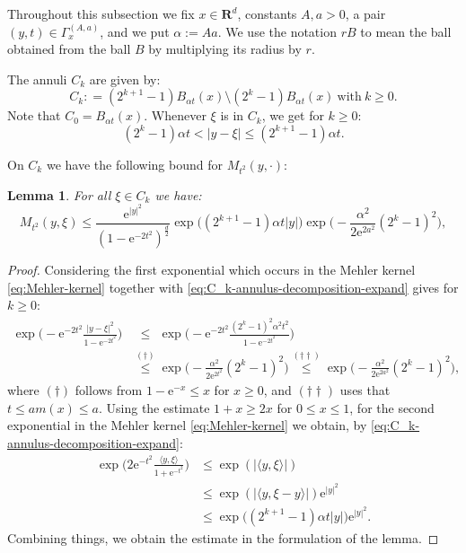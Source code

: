 \documentclass{amsart}
\newtheorem{lemma}{Lemma}
\theoremstyle{remark}
\newcommand{\la}{\langle}
\newcommand{\ra}{\rangle}
\renewcommand{\leq}{\leqslant}
\renewcommand{\leq}{\leqslant}
\renewcommand{\geq}{\geqslant}
\newcommand{\R}{\mathbf R}
\newcommand{\e}{\mathrm{e}} %
\renewcommand{\leq}{\leqslant}%
\renewcommand{\geq}{\geqslant}%
\begin{document}
Throughout this subsection we fix $x\in \R^d$, constants $A,a>0$, a pair
$(y,t)\in \Gamma_x^{(A,a)}$, and we put $\alpha:=Aa$. 
We use the notation $rB$ to mean the ball obtained from the ball $B$ by
multiplying its radius by $r$.

The annuli $C_k$ are given by:
\begin{equation}
  \label{eq:C_k-annulus-decomposition}
  C_k : = (2^{k + 1} - 1)B_{\alpha t}(x) \setminus (2^k - 1)B_{\alpha t}(x)
  \:\text{with}\: k \geq 0.
\end{equation}
Note that $C_0 = B_{\alpha t}(x)$. Whenever $\xi$ is in $C_k$, we get for $k
\geq 0$:
\begin{equation}
  \label{eq:C_k-annulus-decomposition-expand}
  (2^k - 1)\alpha t < |y - \xi| \leq (2^{k + 1} - 1) \alpha t.
\end{equation}

On $C_k$ we have the following bound for $M_{t^2}(y,\cdot)$:
\begin{lemma}\label{lem:On-diagonal-kernel-estimates-on-Ck}
  For all $\xi \in C_k$ we have:
  \begin{equation}
    M_{t^2}(y, \xi) \leq \frac{\e^{|y|^2}}{(1 - \e^{-2t^2})^{\frac{d}2}}
    \exp\bigl((2^{k + 1} - 1) \alpha t |y| \bigr) \exp\Big(\!-\!\frac{\alpha^2}{2 \e^{2 a^2}} (2^k - 1)^2 \Big),
  \end{equation}
\end{lemma}
\begin{proof}
  Considering the first exponential which occurs in the Mehler kernel
  \eqref{eq:Mehler-kernel} together with
  \eqref{eq:C_k-annulus-decomposition-expand} gives for $k \geq 0$:
  \begin{align*}
    \exp\biggl(-\e^{-2t^2} \frac{|y - \xi|^2}{1 - \e^{-2t^2}} \biggr)
    &\overset{\phantom{(\dagger)}}{\leq} \exp\biggl(-\e^{-2t^2} \frac{(2^k - 1)^2 \alpha^2 t^2}{1 - \e^{-2t^2}} \biggr)\\
    &\overset{(\dagger)}{\leq} \exp\biggl(-\frac{\alpha^2}{2 \e^{2t^2}} (2^k - 1)^2 \biggr)
    \overset{(\dagger\dagger)}{\leq} \exp\biggl(-\frac{\alpha^2}{2 \e^{2a^2}} (2^k - 1)^2 \biggr),
  \end{align*}
  where $(\dagger)$ follows from $1 - \e^{-x} \leq x$ for $x \geq 0$, and $(\dagger\dagger)$
  uses that $t \leq am(x) \leq a$. Using the estimate $1+x \geq 2x$ for $0 \leq
  x \leq 1$, for the second exponential in the Mehler kernel
  \eqref{eq:Mehler-kernel} we obtain, by
  \eqref{eq:C_k-annulus-decomposition-expand}:
  \begin{align*}
    \exp\biggl(2\e^{-t^2} \frac{\la y, \xi \ra}{1 + \e^{- t^2}} \biggr)
    & \leq \exp(|\la y, \xi \ra|)\\
    & \leq \exp(|\langle y, \xi-y\rangle|) \e^{|y|^2}\\
    & \leq \exp\bigl((2^{k + 1} - 1) \alpha t |y| \bigr) \e^{|y|^2}.
  \end{align*}
  Combining things, we obtain the estimate in the formulation of the lemma.
\end{proof}
\end{document}
